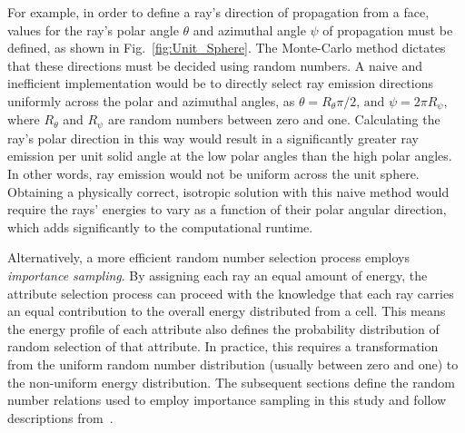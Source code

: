 For example, in order to define a ray's direction of propagation from a face, values for the ray's polar angle $\theta{}$ and azimuthal angle $\psi{}$ of propagation must be defined, as shown in Fig.~\ref{fig:Unit_Sphere}. The Monte-Carlo method dictates that these directions must be decided using random numbers.
A naive and inefficient implementation would be to directly select ray emission directions uniformly across the polar and azimuthal angles, as $\theta{}=R_\theta{}\pi{}/2 \text{, and }\psi{} = 2\pi{}R_\psi{} ,$
where $R_\theta$ and $R_\psi{}$ are random numbers between zero and one. 
Calculating the ray's polar direction in this way would result in a significantly greater ray emission per unit solid angle at the low polar angles than the high polar angles. In other words, ray emission would not be uniform across the unit sphere. Obtaining a physically correct, isotropic solution with this naive method would require the rays' energies to vary as a function of their polar angular direction, which adds significantly to the computational runtime.

Alternatively, a more efficient random number selection process employs \textit{importance sampling}.
By assigning each ray an equal amount of energy, the attribute selection process can proceed with the knowledge that each ray carries an equal contribution to the overall energy distributed from a cell.
This means the energy profile of each attribute also defines the probability distribution of random selection of that attribute. In practice, this requires a transformation from the uniform random number distribution (usually between zero and one) to the non-uniform energy distribution.
The subsequent sections define the random number relations used to employ importance sampling in this study and follow descriptions from~\citet{Modest2022ChapterMediac}.

